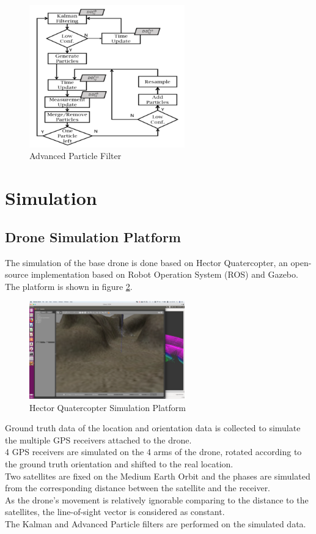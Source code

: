 \documentclass[journal,onecolumn]{IEEEtran}
\begin{document}
\begin{figure}
  \centering
  \captionsetup{justification=centering}
  \includegraphics[width=0.6\textwidth]{fig/APF.png}
  \caption{Advanced Particle Filter}
  \label{APF}
\end{figure}
\section{Simulation}
\subsection{Drone Simulation Platform}
The simulation of the base drone is done based on Hector Quatercopter, an open-source
implementation based on Robot Operation System (ROS) and Gazebo.
The platform is shown in figure \ref{hector}.\\
\begin{figure}
  \centering
  \captionsetup{justification=centering}
  \includegraphics[width=0.6\textwidth]{fig/hector.png}
  \caption{Hector Quatercopter Simulation Platform}
  \label{hector}
\end{figure}
Ground truth data of the location and orientation data is collected to simulate the
multiple GPS receivers attached to the drone.\\
4 GPS receivers are simulated on the 4 arms of the drone, rotated according to
the ground truth orientation and shifted to the real location.\\
Two satellites are fixed on the Medium Earth Orbit and the phases are simulated
from the corresponding distance between the satellite and the receiver.\\
As the drone's movement is relatively ignorable comparing to the distance to the
satellites, the line-of-sight vector is considered as constant.\\
The Kalman and Advanced Particle filters are performed on the simulated data.
\end{document}

